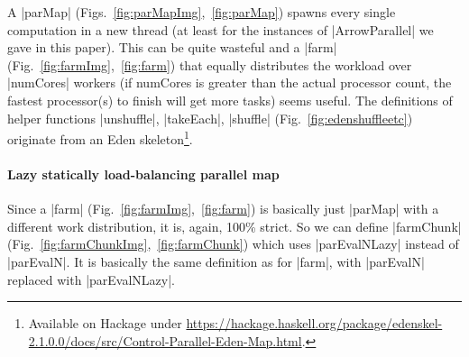 A |parMap| (Figs.~\ref{fig:parMapImg},~\ref{fig:parMap}) spawns every single computation in a new thread (at least for the instances of |ArrowParallel| we gave in this paper). This can be quite wasteful and a |farm| (Fig.~\ref{fig:farmImg},~\ref{fig:farm}) that equally distributes the workload over |numCores| workers (if numCores is greater than the actual processor count, the fastest processor(s) to finish will get more tasks) seems useful.
The definitions of helper functions |unshuffle|, |takeEach|, |shuffle| (Fig.~\ref{fig:edenshuffleetc}) originate from an Eden skeleton\footnote{Available on Hackage under \url{https://hackage.haskell.org/package/edenskel-2.1.0.0/docs/src/Control-Parallel-Eden-Map.html}.}.

\paragraph{Lazy statically load-balancing parallel map}
Since a |farm| (Fig.~\ref{fig:farmImg},~\ref{fig:farm}) is basically just |parMap| with a different work distribution, it is, again, 100\% strict. So we can define |farmChunk| (Fig.~\ref{fig:farmChunkImg},~\ref{fig:farmChunk}) which uses |parEvalNLazy| instead of |parEvalN|. It is basically the same definition as for |farm|, with |parEvalN| replaced with |parEvalNLazy|.

